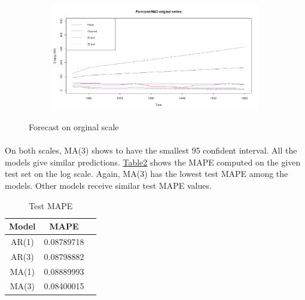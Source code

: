 \documentclass[12pt]{article}
\begin{document}
\begin{figure}[H]
  \begin{subfigure}[b]{0.49\linewidth}
    \includegraphics[width=\linewidth]{figure14-4.png}
  \end{subfigure}
  \caption{Forecast on orginal scale}
  \label{fig:figure14}
\end{figure}

\paragraph{}
On both scales, MA(3) shows to have the smallest 95 confident interval. All the models give similar predictions. \href{table2}{Table2} shows the MAPE computed on the given test set on the log scale. Again, MA(3) has the lowest test MAPE among the models. Other models receive similar test MAPE values. 
\begin{table}[H]
  \begin{center}
    \caption{Test MAPE}
    \label{tab:table2}
    \begin{tabular}{c|c|S} %
      \textbf{Model} & \textbf{MAPE}\\
      \hline
      AR(1) & 0.08789718\\
      AR(3) & 0.08798882\\
      MA(1) & 0.08889993\\
      MA(3) & 0.08400015\\
    \end{tabular}
  \end{center}
\end{table}
\end{document}
